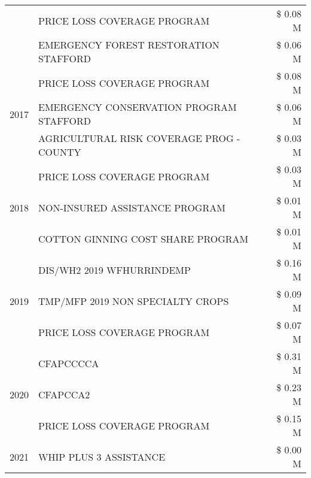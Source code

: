 \begin{tabular}{llr}
 & PRICE LOSS COVERAGE PROGRAM & \$ 0.08 M \\
 & EMERGENCY FOREST RESTORATION STAFFORD & \$ 0.06 M \\
\cline{1-3}
\multirow[t]{3}{*}{2017} & PRICE LOSS COVERAGE PROGRAM & \$ 0.08 M \\
 & EMERGENCY CONSERVATION PROGRAM STAFFORD & \$ 0.06 M \\
 & AGRICULTURAL RISK COVERAGE PROG - COUNTY & \$ 0.03 M \\
\cline{1-3}
\multirow[t]{3}{*}{2018} & PRICE LOSS COVERAGE PROGRAM & \$ 0.03 M \\
 & NON-INSURED ASSISTANCE PROGRAM & \$ 0.01 M \\
 & COTTON GINNING COST SHARE PROGRAM & \$ 0.01 M \\
\cline{1-3}
\multirow[t]{3}{*}{2019} & DIS/WH2 2019 WFHURRINDEMP & \$ 0.16 M \\
 & TMP/MFP 2019 NON SPECIALTY CROPS & \$ 0.09 M \\
 & PRICE LOSS COVERAGE PROGRAM & \$ 0.07 M \\
\cline{1-3}
\multirow[t]{3}{*}{2020} & CFAPCCCCA & \$ 0.31 M \\
 & CFAPCCA2 & \$ 0.23 M \\
 & PRICE LOSS COVERAGE PROGRAM & \$ 0.15 M \\
\cline{1-3}
2021 & WHIP PLUS 3 ASSISTANCE & \$ 0.00 M \\
\cline{1-3}
\bottomrule
\end{tabular}
